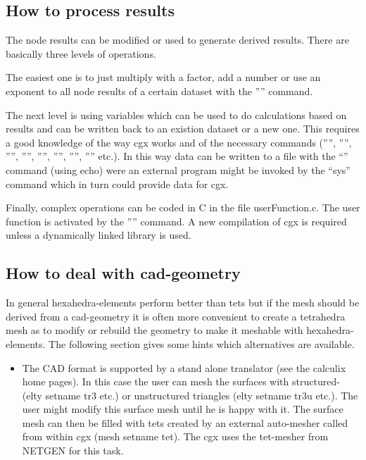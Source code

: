 \documentclass{article}
\begin{document}
\begin{appendix}
\subsection{\label{How to process results}How to process results}
The node results can be modified or used to generate derived results. There are basically three levels of operations.

The easiest one is to just multiply with a factor, add a number or use an exponent to all node results of a certain dataset with the '''' command.

The next level is using variables which can be used to do calculations based on results and can be written back to an existion dataset or a new one. This requires a good knowledge of the way cgx works and of the necessary commands ('''', '''', '''', '''', '''', '''', '''', '''' etc.). In this way data can be written to a file with the ``'' command (using echo) were an external program might be invoked by the ``sys'' command which in turn could provide data for cgx.

Finally, complex operations can be coded in C in the file userFunction.c. The
user function is activated by the '''' command. A new
compilation of cgx is required unless a dynamically linked library is used.

\subsection{\label{How to deal with cad-geometry}How to deal with cad-geometry}
In general hexahedra-elements perform better than tets but if the mesh should be derived from a cad-geometry it is often more convenient to create a tetrahedra mesh as to modify or rebuild the geometry to make it meshable with hexahedra-elements. The following section gives some hints which alternatives are available.

\begin{itemize}

\item The CAD format is supported by a stand alone translator (see the calculix home pages). In this case the user can mesh the surfaces with structured- \cite{Coons} (elty setname tr3 etc.) or unstructured triangles \cite{mesh2d} (elty setname tr3u etc.). The user might modify this surface mesh until he is happy with it. The surface mesh can then be filled with tets created by an external auto-mesher called from within cgx (mesh setname tet). The cgx uses the tet-mesher from NETGEN \cite{NETGEN} for this task. 


\end{itemize}
\end{appendix}
\end{document}
